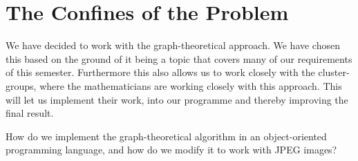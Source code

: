 \section{The Confines of the Problem}
We have decided to work with the graph-theoretical approach. 
We have chosen this based on the ground of it being a topic that covers many of our requirements of this semester. 
Furthermore this also allows us to work closely with the cluster-groups, where the mathematicians are working closely with this approach. 
This will let us implement their work, into our programme and thereby improving the final result.

\vspace{5mm}
\begin{centering}
	\begin{tcolorbox}[center title, title=Problem Statement, width=.7\textwidth]
		How do we implement the graph-theoretical algorithm in an object-oriented programming language, and how do we modify it to work with JPEG images?
	\end{tcolorbox}
\end{centering}